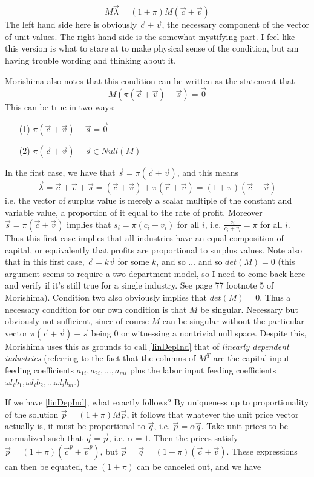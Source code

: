 \[ M\vec{\lambda} = (1+\pi)M(\vec{c}+\vec{v}) \]
The left hand side here is obviously $\vec{c}+\vec{v}$, the necessary component of the vector of unit values. The right hand side is the somewhat mystifying part. I feel like this version is what to stare at to make physical sense of the condition, but am having trouble wording and thinking about it. \par 
Morishima also notes that this condition can be written as the statement that 
\[ M(\pi(\vec{c}+\vec{v})-\vec{s}) = \vec{0} \label{linDepInd} \]
This can be true in two ways:
\begin{itemize}
	\item[(1)] $\pi(\vec{c}+\vec{v})-\vec{s} = \vec{0}$ \\
	\item[(2)] $\pi(\vec{c}+\vec{v})-\vec{s} \in Null(M)$ 
\end{itemize}
In the first case, we have that $\vec{s} = \pi(\vec{c}+\vec{v})$, and this means
\[ \vec{\lambda} = \vec{c}+\vec{v}+\vec{s} = (\vec{c}+\vec{v}) + \pi(\vec{c}+\vec{v}) = (1+\pi)(\vec{c}+\vec{v}) \]
i.e. the vector of surplus value is merely a scalar multiple of the constant and variable value, a proportion of it equal to the rate of profit. Moreover $\vec{s} = \pi(\vec{c}+\vec{v})$ implies that $s_i = \pi(c_i+v_i)$ for all $i$, i.e. $\frac{s_i}{c_i+v_i} = \pi$ for all $i$. Thus this first case implies that all industries have an equal composition of capital, or equivalently that profits are proportional to surplus values. Note also that in this first case, $\vec{c} = k\vec{v}$ for some $k$, and so $\ldots$ and so $det(M) = 0$ (this argument seems to require a two department model, so I need to come back here and verify if it's still true for a single industry. See page 77 footnote 5 of Morishima). Condition two also obviously implies that $det(M) = 0$. Thus a necessary condition for our own condition is that $M$ be singular. Necessary but obviously not sufficient, since of course $M$ can be singular without the particular vector $\pi(\vec{c}+\vec{v})-\vec{s}$ being $0$ or witnessing a nontrivial null space. Despite this, Morishima uses this as grounds to call \ref{linDepInd} that of \emph{linearly dependent industries} (referring to the fact that the columns of $M^T$ are the capital input feeding coefficients $a_{1i},a_{2i},\ldots,a_{mi}$ plus the labor input feeding coefficients $\omega l_i b_1,\omega l_i b_2,\ldots \omega l_i b_m$.) \par 
If we have \ref{linDepInd}, what exactly follows? By uniqueness up to proportionality of the solution $\vec{p} = (1+\pi)M\vec{p}$, it follows that whatever the unit price vector actually is, it must be proportional to $\vec{q}$, i.e. $\vec{p} = \alpha\vec{q}$. Take unit prices to be normalized such that $\vec{q} = \vec{p}$, i.e. $\alpha = 1$. Then the prices satisfy $\vec{p} = (1+\pi)(\vec{c}^p + \vec{v}^p)$, but $\vec{p} = \vec{q} = (1+\pi)(\vec{c}+\vec{v})$. These expressions can then be equated, the $(1+\pi)$ can be canceled out, and we have
